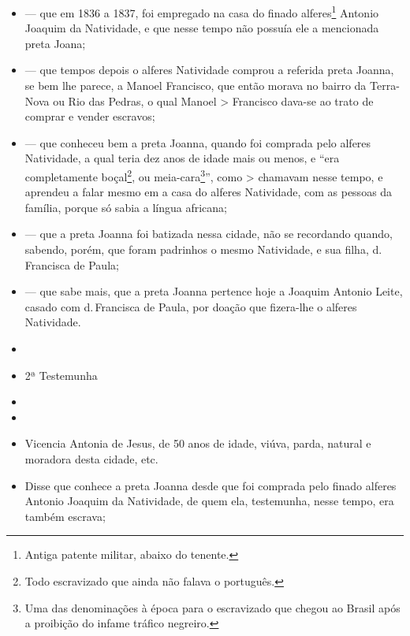 \begin{itemize}
\item
  --- que em 1836 a 1837, foi empregado na casa do finado
  alferes\footnote{ Antiga patente militar, abaixo do tenente.} Antonio
  Joaquim da Natividade, e que nesse tempo não possuía ele a mencionada
  preta Joana;
\item
  --- que tempos depois o alferes Natividade comprou a referida preta
  Joanna, se bem lhe parece, a Manoel Francisco, que então morava no
  bairro da Terra-Nova ou Rio das Pedras, o qual Manoel \textgreater{}
  Francisco dava-se ao trato de comprar e vender escravos;
\item
  --- que conheceu bem a preta Joanna, quando foi comprada pelo alferes
  Natividade, a qual teria dez anos de idade mais ou menos, e ``era
  completamente boçal\footnote{ Todo escravizado que ainda não falava o
    português.}, ou meia-cara\footnote{ Uma das denominações à época
    para o escravizado que chegou ao Brasil após a proibição do infame
    tráfico negreiro.}'', como \textgreater{} chamavam nesse tempo, e
  aprendeu a falar mesmo em a casa do alferes Natividade, com as pessoas
  da família, porque só sabia a língua africana;
\item
  --- que a preta Joanna foi batizada nessa cidade, não se recordando
  quando, sabendo, porém, que foram padrinhos o mesmo Natividade, e sua
  filha, d.\,Francisca de Paula;
\item
  --- que sabe mais, que a preta Joanna pertence hoje a Joaquim Antonio
  Leite, casado com d.\,Francisca de Paula, por doação que fizera-lhe o
  alferes Natividade.
\item
\item
  2ª Testemunha
\item
\item
\item
  Vicencia Antonia de Jesus, de 50 anos de idade, viúva, parda, natural
  e moradora desta cidade, etc.
\item
  Disse que conhece a preta Joanna desde que foi comprada pelo finado
  alferes Antonio Joaquim da Natividade, de quem ela, testemunha, nesse
  tempo, era também escrava;
\end{itemize}

